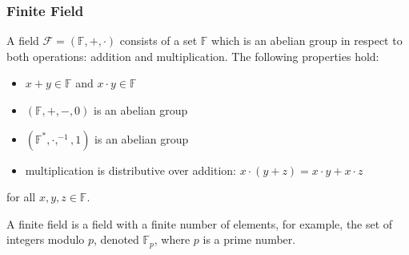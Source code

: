 \subsubsection{Finite Field}
A field $\mathcal{F} = (\mathbb{F}, +, \cdot)$ consists of a set $\mathbb{F}$ which is an abelian group in respect to both operations: addition and multiplication. The following properties hold:
\begin{itemize}
    \item $x + y \in \mathbb{F}$ and $x \cdot y \in \mathbb{F}$
    \item $(\mathbb{F}, +, -, 0)$ is an abelian group
    \item $(\mathbb{F}^*, \cdot, ^{-1}, 1)$ is an abelian group
    \item multiplication is distributive over addition: $x \cdot (y + z) = x \cdot y + x \cdot z$
\end{itemize}
for all $x, y, z \in \mathbb{F}$.

A finite field is a field with a finite number of elements, for example, the set of integers modulo $p$, denoted $\mathbb{F}_p$, where $p$ is a prime number.
